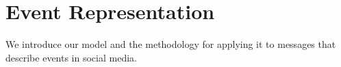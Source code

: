 \section{Event Representation}\label{sec:model}

We introduce our model and the methodology for applying it to messages that
describe events in social media.






